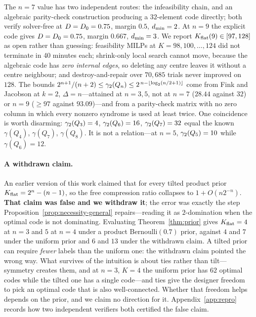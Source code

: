 The $n=7$ value has two independent routes: the infeasibility chain, and an
algebraic parity-check construction producing a $32$-element code directly; both
verify solver-free at $D = D_0 = 0.75$, margin $0.5$, $d_{\min} = 2$. At $n=9$
the explicit code gives $D = D_0 = 0.75$, margin $0.667$, $d_{\min} = 3$. We
report $K_{\mathrm{flat}}(9) \in [97,128]$ as open rather than guessing: feasibility MILPs at
$K = 98,100,\dots,124$ did not terminate in 40 minutes each; shrink-only local
search cannot move, because the algebraic code has \emph{zero internal edges}, so
deleting any centre leaves it without a centre neighbour; and destroy-and-repair
over $70{,}685$ trials never improved on $128$. The bounds
$2^{n+1}/(n+2) \le \gamma_2(Q_n) \le 2^{\,n-\lfloor\log_2(n/2+1)\rfloor}$ come from
Fink and Jacobson at $k=2$, $\Delta=n$---attained at $n=3,5$, not at $n=7$
($28.44$ against $32$) or $n=9$ ($\ge 97$ against $93.09$)---and from a
parity-check matrix with no zero column in which every nonzero syndrome is used
at least twice. One coincidence is worth disarming: $\gamma_2(Q_3)=4$,
$\gamma_2(Q_6)=16$, $\gamma_2(Q_7)=32$ equal the known $\gamma(Q_4)$, $\gamma(Q_7)$,
$\gamma(Q_8)$. It is not a relation---at $n=5$, $\gamma_2(Q_5) = 10$ while
$\gamma(Q_6) = 12$.

\paragraph{A withdrawn claim.}
An earlier version of this work claimed that for every tilted product prior
$K_{\mathrm{flat}} = 2^n - (n-1)$, so the free compression ratio collapses to
$1 + O(n2^{-n})$. \textbf{That claim was false and we withdraw it}; the error was
exactly the step Proposition~\ref{prop:necessity-general} repairs---reading it as
$2$-domination when the optimal code is not dominating. Evaluating
Theorem~\ref{thm:prior} gives $K_{\mathrm{flat}} = 4$ at $n=3$ and $5$ at $n=4$ under a
product Bernoulli$(0.7)$ prior, against $4$ and $7$ under the uniform prior and
$6$ and $13$ under the withdrawn claim. A tilted prior can require \emph{fewer}
labels than the uniform one: the withdrawn claim pointed the wrong way. What
survives of the intuition is about ties rather than tilt---symmetry creates them,
and at $n=3$, $K=4$ the uniform prior has $62$ optimal codes while the tilted one
has a single code---and ties give the designer freedom to pick an optimal code
that is also well-connected. Whether that freedom helps depends on the prior, and
we claim no direction for it. Appendix~\ref{app:repro} records how two
independent verifiers both certified the false claim.
